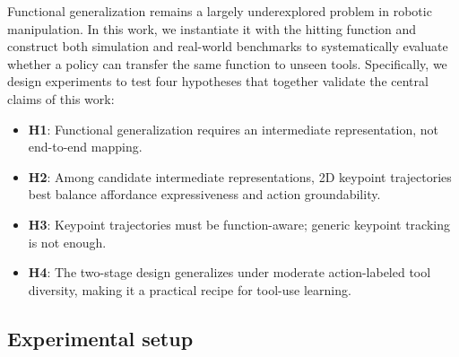 Functional generalization remains a largely underexplored problem in robotic manipulation.
In this work, we instantiate it with the hitting function and construct both simulation and real-world benchmarks to systematically evaluate whether a policy can transfer the same function to unseen tools. Specifically, we design experiments to test four hypotheses that together validate the central claims of this work:
\begin{itemize}[leftmargin=*]
    \item \textbf{H1}: Functional generalization requires an intermediate representation, not end-to-end mapping.
    \item \textbf{H2}: Among candidate intermediate representations, 2D keypoint trajectories best balance affordance expressiveness and action groundability.
    \item \textbf{H3}: Keypoint trajectories must be function-aware; generic keypoint tracking is not enough.
    \item \textbf{H4}: The two-stage design generalizes under moderate action-labeled tool diversity, making it a practical recipe for tool-use learning.
\end{itemize}

\subsection{Experimental setup}



